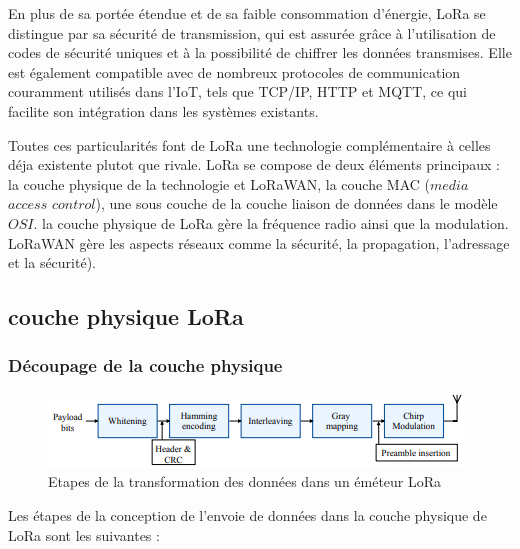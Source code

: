 \vspace{0.1cm}

En plus de sa portée étendue et de sa faible consommation d'énergie, LoRa se distingue par sa sécurité de transmission, qui est assurée grâce à l'utilisation de codes de sécurité uniques et à la possibilité de chiffrer les données transmises. Elle est également compatible avec de nombreux protocoles de communication couramment utilisés dans l'IoT, tels que TCP/IP, HTTP et MQTT, ce qui facilite son intégration dans les systèmes existants.

\vspace{0.1cm}

Toutes ces  particularités font de LoRa une technologie complémentaire à celles déja existente plutot que rivale.
LoRa se compose de deux éléments principaux : la couche physique de la technologie et LoRaWAN, la couche MAC ($media$ $access$ $control$), une sous couche de la couche liaison de données dans le modèle $OSI$. la couche physique de LoRa gère la fréquence radio ainsi que la modulation. LoRaWAN gère les aspects réseaux comme la sécurité, la propagation, l'adressage et la sécurité).

\subsection{couche physique LoRa}

\subsubsection{Découpage de la couche physique}

\begin{figure}[h]
\centering

\includegraphics[scale=1]{images/physical_lora_rx.PNG}
\caption{Etapes de la transformation des données dans un éméteur LoRa}\label{term4}
\end{figure}


Les étapes de la conception de l'envoie de données dans la couche physique de LoRa sont les suivantes :

\vspace{0.1cm}

